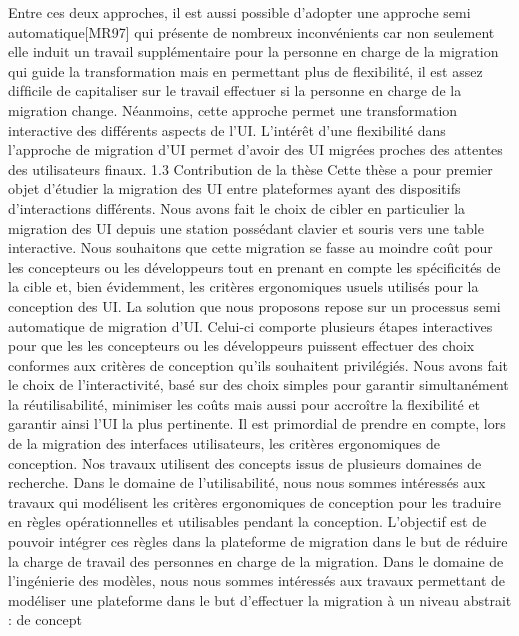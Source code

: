 \documentclass{article}
\begin{document}
Entre ces deux approches, il est aussi possible d’adopter une approche semi automatique[MR97]
qui pr\'{e}sente de nombreux inconv\'{e}nients car non seulement elle induit un travail suppl\'{e}mentaire pour
la personne en charge de la migration qui guide la transformation mais en permettant plus de ﬂexibilit\'{e},
il est assez difﬁcile de capitaliser sur le travail effectuer si la personne en charge de la migration
change. N\'{e}anmoins, cette approche permet une transformation interactive des diff\'{e}rents aspects de
l’UI. L’int\'{e}r\^{e}t d’une ﬂexibilit\'{e} dans l’approche de migration d’UI permet d’avoir des UI migr\'{e}es
proches des attentes des utilisateurs ﬁnaux.
1.3
Contribution de la th\`{e}se
Cette th\`{e}se a pour premier objet d’\'{e}tudier la migration des UI entre plateformes ayant des dispositifs d’interactions diff\'{e}rents. Nous avons fait le choix de cibler en particulier la migration des
UI depuis une station poss\'{e}dant clavier et souris vers une table interactive. Nous souhaitons que
cette migration se fasse au moindre co\^{u}t pour les concepteurs ou les d\'{e}veloppeurs tout en prenant en
compte les sp\'{e}ciﬁcit\'{e}s de la cible et, bien \'{e}videmment, les crit\`{e}res ergonomiques usuels utilis\'{e}s pour
la conception des UI.
La solution que nous proposons repose sur un processus semi automatique de migration d’UI.
Celui-ci comporte plusieurs \'{e}tapes interactives pour que les les concepteurs ou les d\'{e}veloppeurs
puissent effectuer des choix conformes aux crit\`{e}res de conception qu’ils souhaitent privil\'{e}gi\'{e}s. Nous
avons fait le choix de l’interactivit\'{e}, bas\'{e} sur des choix simples pour garantir simultan\'{e}ment la r\'{e}utilisabilit\'{e}, minimiser les co\^{u}ts mais aussi pour accro\^{i}tre la ﬂexibilit\'{e} et garantir ainsi l’UI la plus
pertinente.
Il est primordial de prendre en compte, lors de la migration des interfaces utilisateurs, les crit\`{e}res ergonomiques de conception. Nos travaux utilisent des concepts issus de plusieurs domaines de
recherche.
Dans le domaine de l’utilisabilit\'{e}, nous nous sommes int\'{e}ress\'{e}s aux travaux qui mod\'{e}lisent les
crit\`{e}res ergonomiques de conception pour les traduire en r\`{e}gles op\'{e}rationnelles et utilisables pendant
la conception. L’objectif est de pouvoir int\'{e}grer ces r\`{e}gles dans la plateforme de migration dans le but
de r\'{e}duire la charge de travail des personnes en charge de la migration.
Dans le domaine de l’ing\'{e}nierie des mod\`{e}les, nous nous sommes int\'{e}ress\'{e}s aux travaux permettant
de mod\'{e}liser une plateforme dans le but d’effectuer la migration \`{a} un niveau abstrait : de concept
\end{document}
